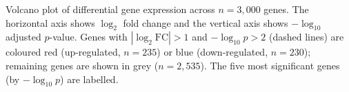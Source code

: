 \caption{Volcano plot of differential gene expression across $n=3{,}000$ genes.
The horizontal axis shows $\log_2$ fold change and the vertical axis shows $-\log_{10}$ adjusted $p$-value.
Genes with $|\log_2\text{FC}|>1$ and $-\log_{10}p>2$ (dashed lines) are coloured red (up-regulated, $n=235$) or blue (down-regulated, $n=230$); remaining genes are shown in grey ($n=2{,}535$).
The five most significant genes (by $-\log_{10}p$) are labelled.}
